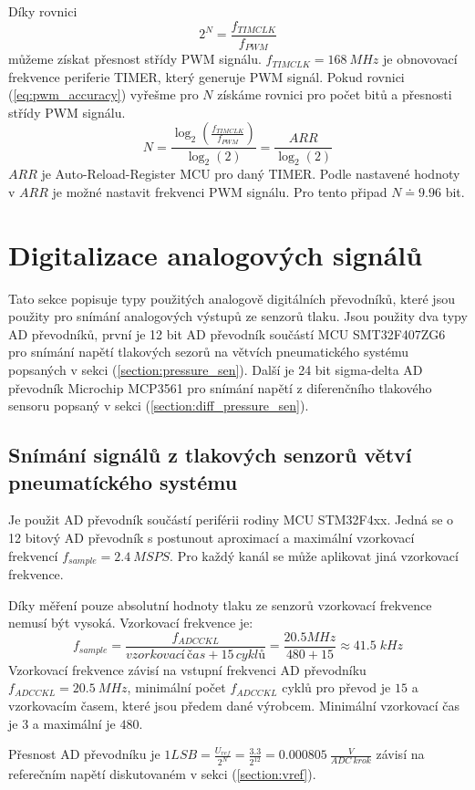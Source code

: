 \par
Díky rovnici
\begin{equation} \label{eq:pwm_accuracy}
    2^N = \frac{f_{TIMCLK}}{f_{PWM}}
\end{equation}
můžeme získat přesnost střídy PWM signálu. $f_{TIMCLK} = 168 \ MHz$ je obnovovací frekvence periferie TIMER, který generuje PWM signál. Pokud rovnici (\ref{eq:pwm_accuracy}) vyřešme pro $N$ získáme rovnici pro počet bitů a přesnosti střídy PWM signálu.
\begin{equation}
    N = \frac{\log_{2} (\frac{f_{TIMCLK}}{f_{PWM}})}{\log_{2}(2)} = \frac{ARR}{\log_{2}(2)}
\end{equation}
$ARR$ je Auto-Reload-Register MCU pro daný TIMER. Podle nastavené hodnoty v $ARR$ je možné nastavit frekvenci PWM signálu. Pro tento připad $N \doteq 9.96 $ bit.

\section{Digitalizace analogových signálů}
Tato sekce popisuje typy použitých analogově digitálních převodníků, které jsou použity pro snímání analogových výstupů ze senzorů tlaku. Jsou použity dva typy AD převodníků, první je 12 bit AD převodník součástí MCU SMT32F407ZG6 pro snímání napětí tlakových sezorů na větvích pneumatického systému popsaných v sekci (\ref{section:pressure_sen}).
Další je 24 bit sigma-delta AD převodník Microchip MCP3561 pro snímání napětí z diferenčního tlakového sensoru popsaný v sekci (\ref{section:diff_pressure_sen}).

\subsection{Snímání signálů z tlakových senzorů větví pneumatíckého systému}
Je použit AD převodník součástí periférii rodiny MCU STM32F4xx. Jedná se o 12 bitový AD převodník s postunout aproximací a maximální vzorkovací frekvencí $f_{sample} = 2.4 \ MSPS$. Pro každý kanál se může aplikovat jiná vzorkovací frekvence. \par
Díky měření pouze absolutní hodnoty tlaku ze senzorů vzorkovací frekvence nemusí být vysoká. Vzorkovací frekvence je:
\begin{equation}
    f_{sample}=\frac{f_{ADCCKL}}{vzorkovací \, čas + 15 \, cyklů } = \frac{20.5 \! MHz}{480 + 15} \approx 41.5 \; kHz
\end{equation}
Vzorkovací frekvence závisí na vstupní frekvenci AD převodníku $f_{ADCCKL} = 20.5 \ MHz$, minimální počet $f_{ADCCKL} $ cyklů pro převod je $15$ a vzorkovacím časem, které jsou předem dané výrobcem. Minimální vzorkovací čas je $3$ a maximální je $480$.
\par
Přesnost AD převodníku je $1 LSB = \frac{U_{ref}}{2^N} = \frac{3.3}{2^{12}} = 0.000805 \ \frac{V}{ADC \ krok}$ závisí na referečním napětí diskutovaném v sekci (\ref{section:vref}).

